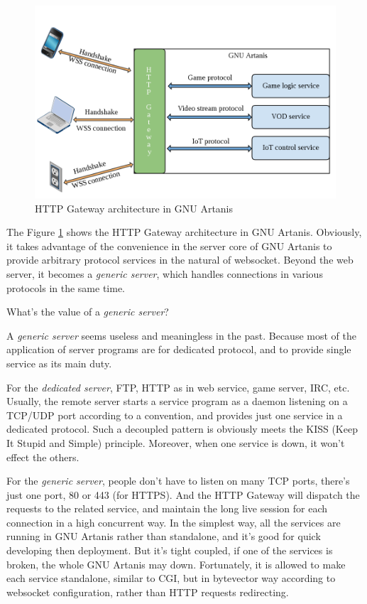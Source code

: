 \documentclass[preprint,numbers,numberedpars,10pt]{sigplanconf}
\begin{document}
\begin{figure}[tbph]
  \centering
  \includegraphics[scale=0.25]{httpgw.png}
  \caption{HTTP Gateway architecture in GNU Artanis}
  \label{fig:httpgw}
\end{figure}

The Figure \ref{fig:httpgw} shows the HTTP Gateway architecture in GNU Artanis.
Obviously, it takes advantage of the convenience in the server core of GNU Artanis to provide arbitrary protocol services in the
natural of websocket. Beyond the web server, it becomes a {\it generic server}, which handles connections in various protocols in the
same time.

What's the value of a {\it generic server}?

A {\it generic server} seems useless and meaningless in the past. Because most of the application of server programs are for dedicated
protocol, and to provide single service as its main duty.

For the {\it dedicated server}, FTP, HTTP as in web service, game server, IRC, etc. Usually, the remote server starts a service program
as a daemon listening on a TCP/UDP port according to a convention, and provides just one service in a dedicated protocol. Such a decoupled
pattern is obviously meets the KISS (Keep It Stupid and Simple) principle. Moreover, when one service is down, it won't effect the others.

For the {\it generic server}, people don't have to listen on many TCP ports, there's just one port, 80 or 443 (for HTTPS). And the HTTP
Gateway will dispatch the requests to the related service, and maintain the long live session for each connection in a high concurrent way.
In the simplest way, all the services are running in GNU Artanis rather than standalone, and it's good for quick developing then deployment.
But it's tight coupled, if one of the services is broken, the whole GNU Artanis may down. Fortunately, it is allowed to make each service
standalone, similar to CGI, but in bytevector way according to websocket configuration, rather than HTTP requests redirecting.
\end{document}
